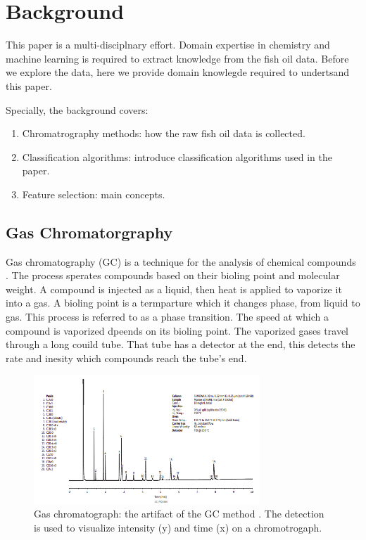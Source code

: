 \documentclass[runningheads]{llncs}
\begin{document}
\section{Background}

This paper is a multi-disciplnary effort.
Domain expertise in chemistry and machine learning is required to extract knowledge from the fish oil data. 
Before we explore the data, here we provide domain knowlegde required to undertsand this paper. 

Specially, the background covers: 
\begin{enumerate}
  \item Chromatrography methods: how the raw fish oil data is collected.
  \item Classification algorithms: introduce classification algorithms used in the paper.
  \item Feature selection: main concepts.
\end{enumerate}

\subsection{Gas Chromatorgraphy}

Gas chromatography (GC) is a technique for the analysis of chemical compounds \cite{eder1995gas,restek2018high,khan2013gas}.
The process sperates compounds based on their bioling point and molecular weight.
A compound is injected as a liquid, then heat is applied to vaporize it into a gas. 
A bioling point is a termparture which it changes phase, from liquid to gas. 
This process is referred to as a phase transition. 
The speed at which a compound is vaporized dpeends on its bioling point. 
The vaporized gases travel through a long couild tube.
That tube has a detector at the end, this detects the rate and inesity which compounds reach the tube's end. 

\begin{figure}[htb]
  \centering
  \includegraphics[width=8.5cm]{chromatograph.png}
  \caption{
    Gas chromatograph: the artifact of the GC method \cite{restek2018high}.
    The detection is used to visualize intensity (y) and time (x) on a chromotrogaph.}
  \label{fig:gas-chromatography}%
  \captionsetup[figure]{font=small,labelfont=small}
\end{figure}
\end{document}

